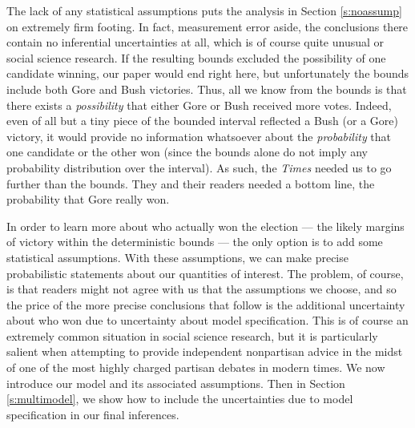 \documentclass[11pt,titlepage]{article}
\begin{document}
The lack of any statistical assumptions puts the analysis in Section
\ref{s:noassump} on extremely firm footing.  In fact, measurement
error aside, the conclusions there contain no inferential
uncertainties at all, which is of course quite unusual or social
science research.  If the resulting bounds excluded the possibility of
one candidate winning, our paper would end right here, but
unfortunately the bounds include both Gore and Bush victories.  Thus,
all we know from the bounds is that there exists a \emph{possibility}
that either Gore or Bush received more votes.  Indeed, even of all but
a tiny piece of the bounded interval reflected a Bush (or a Gore)
victory, it would provide no information whatsoever about the
\emph{probability} that one candidate or the other won (since the
bounds alone do not imply any probability distribution over the
interval).  As such, the \emph{Times} needed us to go further than the
bounds.  They and their readers needed a bottom line, the probability
that Gore really won.

In order to learn more about who actually won the election --- the
likely margins of victory within the deterministic bounds --- the only
option is to add some statistical assumptions.  With these
assumptions, we can make precise probabilistic statements about our
quantities of interest.  The problem, of course, is that readers might
not agree with us that the assumptions we choose, and so the price of
the more precise conclusions that follow is the additional uncertainty
about who won due to uncertainty about model specification.  This is
of course an extremely common situation in social science research,
but it is particularly salient when attempting to provide independent
nonpartisan advice in the midst of one of the most highly charged
partisan debates in modern times.  We now introduce our model and its
associated assumptions.  Then in Section \ref{s:multimodel}, we show
how to include the uncertainties due to model specification in our
final inferences.
\end{document}
